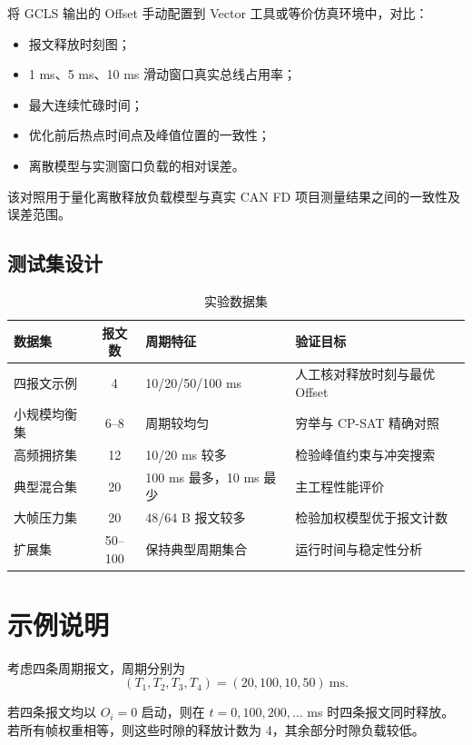 \documentclass[UTF8,12pt,a4paper]{ctexart}
\begin{document}
将 GCLS 输出的 Offset 手动配置到 Vector 工具或等价仿真环境中，对比：

\begin{itemize}
  \item 报文释放时刻图；
  \item 1 ms、5 ms、10 ms 滑动窗口真实总线占用率；
  \item 最大连续忙碌时间；
  \item 优化前后热点时间点及峰值位置的一致性；
  \item 离散模型与实测窗口负载的相对误差。
\end{itemize}

该对照用于量化离散释放负载模型与真实 CAN FD 项目测量结果之间的一致性及误差范围。

\subsection{测试集设计}

\begin{table}[htbp]
\centering
\caption{实验数据集}
\label{tab:testsets}
\begin{tabularx}{\textwidth}{lclX}
\toprule
数据集 & 报文数 & 周期特征 & 验证目标\\
\midrule
四报文示例 & 4 & 10/20/50/100 ms & 人工核对释放时刻与最优 Offset\\
小规模均衡集 & 6--8 & 周期较均匀 & 穷举与 CP-SAT 精确对照\\
高频拥挤集 & 12 & 10/20 ms 较多 & 检验峰值约束与冲突搜索\\
典型混合集 & 20 & 100 ms 最多，10 ms 最少 & 主工程性能评价\\
大帧压力集 & 20 & 48/64 B 报文较多 & 检验加权模型优于报文计数\\
扩展集 & 50--100 & 保持典型周期集合 & 运行时间与稳定性分析\\
\bottomrule
\end{tabularx}
\end{table}

\section{示例说明}

考虑四条周期报文，周期分别为
\begin{equation}
 (T_1,T_2,T_3,T_4)=(20,100,10,50)\ \mathrm{ms}.
\end{equation}

若四条报文均以 $O_i=0$ 启动，则在 $t=0,100,200,\ldots$ ms 时四条报文同时释放。若所有帧权重相等，则这些时隙的释放计数为 4，其余部分时隙负载较低。
\end{document}
